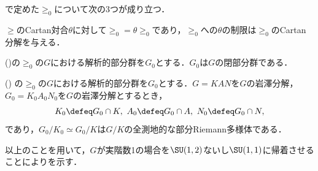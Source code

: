 で定めた$\ge_0$について次の3つが成り立つ．
\begin{lem}\cite[p.~409, Lemma~2.2]{hel01}$\ge$のCartan対合$\theta$に対して$\ge_0 = \theta\ge_0$であり，$\ge_0 $への$\theta$の制限は$\ge_0$のCartan分解を与える．
\end{lem}

\begin{lem}(\cite[p.~82]{yos38})の$\ge_0$の$G$における解析的部分群を$G_0$とする．$G_0 $は$G$の閉部分群である．
\end{lem}


\begin{lem}(\cite[p.~409, Lemma~2.3]{hel01}) の$\ge_0$の$G$における解析的部分群を$G_0$とする．$G = KAN$を$G$の岩澤分解，$G_0 = K_0A_0N_0$を$G$の岩澤分解とするとき，
  \begin{align*}
    K_0\defeq G_0\cap K,\ A_0 \defeq G_0\cap A,\ N_0\defeq G_0\cap N, 
  \end{align*}
  であり，$G_0/K_0 \simeq G_0/K$は$G/K$の全測地的な部分Riemann多様体である．
  
\end{lem}

以上のことを用いて，$G$が実階数1の場合を$\SU(1,2) $ないし$\SU(1,1) $に帰着させることによりを示す．

